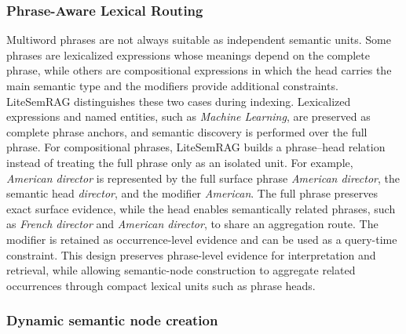 \documentclass[conference]{IEEEtran}
\begin{document}
\subsubsection{Phrase-Aware Lexical Routing}
Multiword phrases are not always suitable as independent semantic units. Some phrases are lexicalized expressions whose meanings depend on the complete phrase, while others are compositional expressions in which the head carries the main semantic type and the modifiers provide additional constraints. LiteSemRAG distinguishes these two cases during indexing. Lexicalized expressions and named entities, such as \emph{Machine Learning}, are preserved as complete phrase anchors, and semantic discovery is performed over the full phrase. For compositional phrases, LiteSemRAG builds a phrase--head relation instead of treating the full phrase only as an isolated unit. For example, \emph{American director} is represented by the full surface phrase \emph{American director}, the semantic head \emph{director}, and the modifier \emph{American}. The full phrase preserves exact surface evidence, while the head enables semantically related phrases, such as \emph{French director} and \emph{American director}, to share an aggregation route. The modifier is retained as occurrence-level evidence and can be used as a query-time constraint. This design preserves phrase-level evidence for interpretation and retrieval, while allowing semantic-node construction to aggregate related occurrences through compact lexical units such as phrase heads.


\subsubsection{Dynamic semantic node creation}
\end{document}

